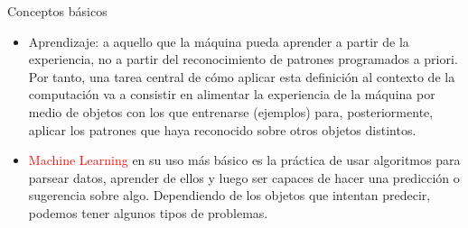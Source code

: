 \documentclass[11pt]{beamer}
\begin{document}
\begin{frame}{Conceptos b\'asicos}
\scriptsize{
	
\begin{itemize}
	\item \textcolor{green!55!purple}{Aprendizaje}: a aquello que la m\'aquina pueda aprender a partir de la experiencia, no a partir del reconocimiento de patrones programados a priori. Por tanto, una tarea central de c\'omo aplicar esta definici\'on al contexto de la computaci\'on va a consistir en alimentar la experiencia de la m\'aquina por medio de objetos con los que entrenarse (ejemplos) para, posteriormente, aplicar los patrones que haya reconocido sobre otros objetos distintos.
\item \textcolor{red}{Machine Learning} en su uso m\'as b\'asico es la pr\'actica de usar algoritmos para parsear datos, aprender de ellos y luego ser capaces de hacer una predicci\'on o sugerencia sobre algo. Dependiendo de los objetos que intentan predecir, podemos tener algunos  tipos de problemas.

\end{itemize}
		}
\end{frame}
\end{document}
